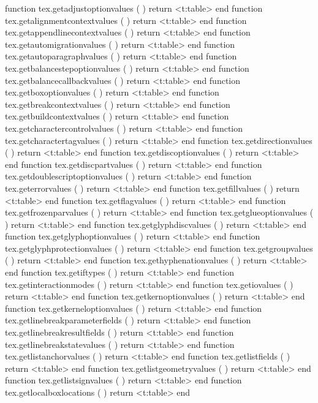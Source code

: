 \starttyping[option=LUA]
function tex.getadjustoptionvalues        ( ) return <t:table> end
function tex.getalignmentcontextvalues    ( ) return <t:table> end
function tex.getappendlinecontextvalues   ( ) return <t:table> end
function tex.getautomigrationvalues       ( ) return <t:table> end
function tex.getautoparagraphvalues       ( ) return <t:table> end
function tex.getbalancestepoptionvalues   ( ) return <t:table> end
function tex.getbalancecallbackvalues     ( ) return <t:table> end
function tex.getboxoptionvalues           ( ) return <t:table> end
function tex.getbreakcontextvalues        ( ) return <t:table> end
function tex.getbuildcontextvalues        ( ) return <t:table> end
function tex.getcharactercontrolvalues    ( ) return <t:table> end
function tex.getcharactertagvalues        ( ) return <t:table> end
function tex.getdirectionvalues           ( ) return <t:table> end
function tex.getdiscoptionvalues          ( ) return <t:table> end
function tex.getdiscpartvalues            ( ) return <t:table> end
function tex.getdoublescriptoptionvalues  ( ) return <t:table> end
function tex.geterrorvalues               ( ) return <t:table> end
function tex.getfillvalues                ( ) return <t:table> end
function tex.getflagvalues                ( ) return <t:table> end
function tex.getfrozenparvalues           ( ) return <t:table> end
function tex.getglueoptionvalues          ( ) return <t:table> end
function tex.getglyphdiscvalues           ( ) return <t:table> end
function tex.getglyphoptionvalues         ( ) return <t:table> end
function tex.getglyphprotectionvalues     ( ) return <t:table> end
function tex.getgroupvalues               ( ) return <t:table> end
function tex.gethyphenationvalues         ( ) return <t:table> end
function tex.getiftypes                   ( ) return <t:table> end
function tex.getinteractionmodes          ( ) return <t:table> end
function tex.getiovalues                  ( ) return <t:table> end
function tex.getkernoptionvalues          ( ) return <t:table> end
function tex.getkerneloptionvalues        ( ) return <t:table> end
function tex.getlinebreakparameterfields  ( ) return <t:table> end
function tex.getlinebreakresultfields     ( ) return <t:table> end
function tex.getlinebreakstatevalues      ( ) return <t:table> end
function tex.getlistanchorvalues          ( ) return <t:table> end
function tex.getlistfields                ( ) return <t:table> end
function tex.getlistgeometryvalues        ( ) return <t:table> end
function tex.getlistsignvalues            ( ) return <t:table> end
function tex.getlocalboxlocations         ( ) return <t:table> end
